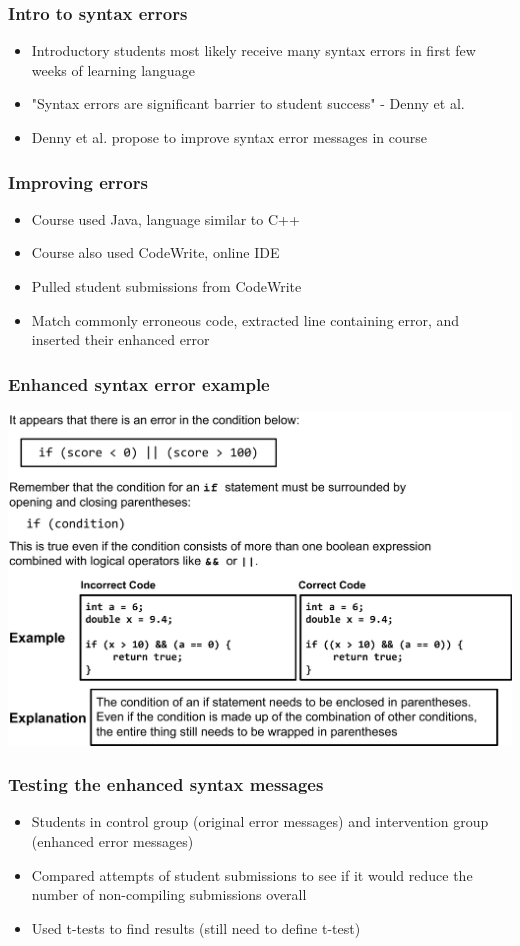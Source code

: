 \documentclass{beamer}
\begin{document}
\begin{frame}
	\frametitle{Intro to syntax errors}
		\begin{itemize}
			\item Introductory students most likely receive many syntax errors in first few weeks of learning language
			\item "Syntax errors are significant barrier to student success" - Denny et al.
			\item Denny et al. propose to improve syntax error messages in course
		\end{itemize}

\end{frame}

\begin{frame}
	\frametitle{Improving errors}
		\begin{itemize}
			\item Course used Java, language similar to C++
			\item Course also used CodeWrite, online IDE
			\item Pulled student submissions from CodeWrite
			\item Match commonly erroneous code, extracted line containing error, and inserted their enhanced error
		\end{itemize}

\end{frame}

\begin{frame}
	\frametitle{Enhanced syntax error example}
	\includegraphics[keepaspectratio, width=0.8 \textwidth]{EnhancedSyntaxErrorSlide.pdf}
\end{frame}

\begin{frame}
	\frametitle{Testing the enhanced syntax messages}
		\begin{itemize}
			\item Students in control group (original error messages) and intervention group (enhanced error messages)
			\item Compared attempts of student submissions to see if it would reduce the number of non-compiling submissions overall
			\item Used t-tests to find results
			(still need to define t-test)
		\end{itemize}

\end{frame}
\end{document}
